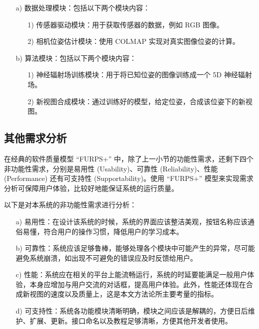 \begin{enumerate}
    \item [a)] 数据处理模块：包括以下两个模块内容：
               \begin{enumerate}
                   \item [1)] 传感器驱动模块：用于获取传感器的数据，例如 RGB 图像。
                   \item [2)] 相机位姿估计模块：使用 COLMAP \cite{schonberger2016structure} 实现对真实图像位姿的计算。
               \end{enumerate}
    \item [b)] 算法模块：包括以下两个模块内容：
               \begin{enumerate}
                   \item [1)] 神经辐射场训练模块：用于将已知位姿的图像训练成一个 5D 神经辐射场。
                   \item [2)] 新视图合成模块：通过训练好的模型，给定位姿，合成该位姿下的新视图。
               \end{enumerate}        
\end{enumerate}

\subsection{其他需求分析}
在经典的软件质量模型 “FURPS+” 中，除了上一小节的功能性需求，还剩下四个非功能性需求，分别是易用性 (Usability)、可靠性 (Reliability)、性能 (Performance) 还有可支持性 (Supportability)。使用 “FURPS+” 模型来实现需求分析可保障用户体验，比较好地能保证系统的运行质量。

以下是对本系统的非功能性需求进行分析：
\begin{enumerate}
    \item [a)] 易用性：在设计该系统的时候，系统的界面应该整洁美观，按钮名称应该通俗易懂，符合用户的操作习惯，降低用户的学习成本。
    \item [b)] 可靠性：系统应该足够鲁棒，能够处理各个模块中可能产生的异常，尽可能避免系统崩溃，如出现不可避免的错误应及时反馈给用户。     
    \item [c)] 性能：系统应在相关的平台上能流畅运行，系统的时延要能满足一般用户体验，本身应增加与用户交流的对话框，提高用户体验。此外，性能还体现在合成新视图的速度以及质量上，这是本文方法论所主要考量的指标。
    \item [d)] 可支持性：系统各功能模块清晰明确，模块之间应该是解耦的，方便日后维护、扩展、更新。接口命名以及教程足够清晰，方便其他开发者使用。
\end{enumerate}

